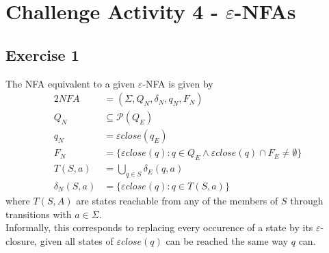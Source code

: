 \documentclass[docid=CA04]{tcom_CA}
\begin{document}
\setcounter{section}{3}
\section{Challenge Activity 4 - \texorpdfstring{$\varepsilon$}{epsilon}-NFAs}
\subsection{Exercise 1}
The NFA equivalent to a given $\varepsilon$-NFA is given by
\begin{alignat*}{2}
	NFA &= (\Sigma, Q_N, \delta_N, q_N, F_N)\\
	Q_N &\subseteq \mathscr{P}(Q_E)\\
	q_N &= \varepsilon close(q_E)\\
	F_N &= \{\varepsilon close(q)\colon q \in Q_E \wedge \varepsilon close(q) \cap F_E \neq \emptyset\}\\
	T(S,a)&= \bigcup_{q\in S}{\delta_E(q,a)}\\
	\delta_N(S,a) &= \{\varepsilon close(q)\colon q \in T(S,a)\}
\end{alignat*}
where $T(S,A)$ are states reachable from any of the members of $S$ through transitions with $a\in \Sigma$.\\
Informally, this corresponds to replacing every occurence of a state by its $\varepsilon$-closure, given all states of $\varepsilon close(q)$ can be reached the same way $q$ can.
\end{document}
